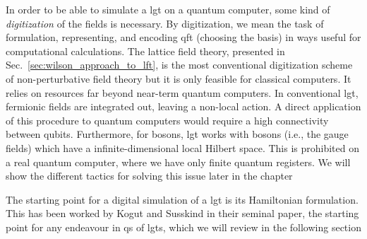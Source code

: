 In order to be able to simulate a \ac{lgt} on a quantum computer, some kind of \emph{digitization} of the fields is necessary.
By digitization, we mean the task of formulation, representing, and encoding \ac{qft} (choosing the basis) in ways useful for computational calculations.
The lattice field theory, presented in Sec.~\ref{sec:wilson_approach_to_lft}, is the most conventional digitization scheme of non-perturbative field theory but it is only feasible for classical computers.
It relies on resources far beyond near-term quantum computers.
In conventional \ac{lgt}, fermionic fields are integrated out, leaving a non-local action.
A direct application of this procedure to quantum computers would require a high connectivity between qubits.
Furthermore, for bosons, \ac{lgt} works with bosons (i.e., the gauge fields) which have a infinite-dimensional local Hilbert space.
This is prohibited on a real quantum computer, where we have only finite quantum registers.
We will show the different tactics for solving this issue later in the chapter

The starting point for a digital simulation of a \ac{lgt} is its Hamiltonian formulation.
This has been worked by Kogut and Susskind in their seminal paper\citneeded, the starting point for any endeavour in \ac{qs} of \ac{lgt}s, which we will review in the following section


